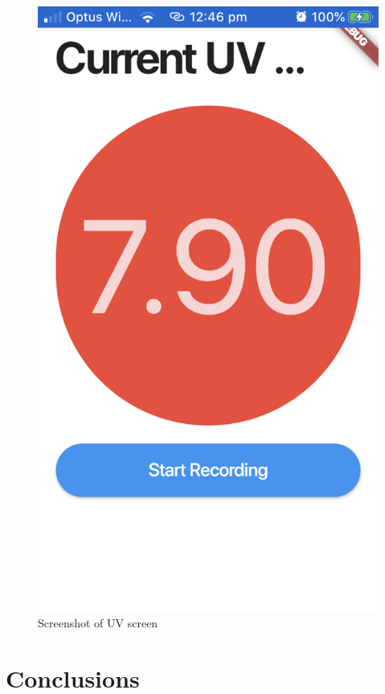 \documentclass[12pt,openany,a4paper]{book}
\begin{document}
	\begin{figure}[h]
		\centering\includegraphics[width=\textwidth]{UVScreen.jpeg}
		\caption{Screenshot of UV screen}
		\label{fig:uv_screen}
		\end{figure}
		
	

\cleardoublepage

\chapter{Conclusions}
\end{document}
